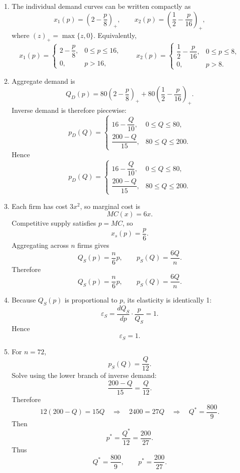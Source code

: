 \documentclass[12pt]{article}
\begin{document}
\begin{enumerate}[label=(\alph*)]
    \item
    The individual demand curves can be written compactly as
    \[
    x_1(p)=\left(2-\frac{p}{8}\right)_+,
    \qquad
    x_2(p)=\left(\frac12-\frac{p}{16}\right)_+,
    \]
    where \((z)_+=\max\{z,0\}\). Equivalently,
    \[
    \boxed{
    x_1(p)=
    \begin{cases}
    2-\dfrac{p}{8}, & 0\le p\le 16,\\
    0, & p>16,
    \end{cases}
    \qquad
    x_2(p)=
    \begin{cases}
    \dfrac12-\dfrac{p}{16}, & 0\le p\le 8,\\
    0, & p>8.
    \end{cases}}
    \]

    \item
    Aggregate demand is
    \[
    Q_D(p)=80\left(2-\frac{p}{8}\right)_+ + 80\left(\frac12-\frac{p}{16}\right)_+.
    \]
    Inverse demand is therefore piecewise:
    \[
    p_D(Q)=
    \begin{cases}
    16-\dfrac{Q}{10}, & 0\le Q\le 80,\\[0.7em]
    \dfrac{200-Q}{15}, & 80\le Q\le 200.
    \end{cases}
    \]
    Hence
    \[
    \boxed{
    p_D(Q)=
    \begin{cases}
    16-\dfrac{Q}{10}, & 0\le Q\le 80,\\[0.7em]
    \dfrac{200-Q}{15}, & 80\le Q\le 200.
    \end{cases}}
    \]

    \item
    Each firm has cost \(3x^2\), so marginal cost is
    \[
    MC(x)=6x.
    \]
    Competitive supply satisfies \(p=MC\), so
    \[
    x_s(p)=\frac{p}{6}.
    \]
    Aggregating across \(n\) firms gives
    \[
    Q_S(p)=\frac{n}{6}p,
    \qquad
    p_S(Q)=\frac{6Q}{n}.
    \]
    Therefore
    \[
    \boxed{Q_S(p)=\frac{n}{6}p,\qquad p_S(Q)=\frac{6Q}{n}.}
    \]

    \item
    Because \(Q_S(p)\) is proportional to \(p\), its elasticity is identically 1:
    \[
    \varepsilon_S=\frac{dQ_S}{dp}\cdot \frac{p}{Q_S}=1.
    \]
    Hence
    \[
    \boxed{\varepsilon_S=1.}
    \]

    \item
    For \(n=72\),
    \[
    p_S(Q)=\frac{Q}{12}.
    \]
    Solve using the lower branch of inverse demand:
    \[
    \frac{200-Q}{15}=\frac{Q}{12}.
    \]
    Therefore
    \[
    12(200-Q)=15Q
    \quad\Longrightarrow\quad
    2400=27Q
    \quad\Longrightarrow\quad
    Q^*=\frac{800}{9}.
    \]
    Then
    \[
    p^*=\frac{Q^*}{12}=\frac{200}{27}.
    \]
    Thus
    \[
    \boxed{Q^*=\frac{800}{9},\qquad p^*=\frac{200}{27}.}
    \]


\end{enumerate}
\end{document}
